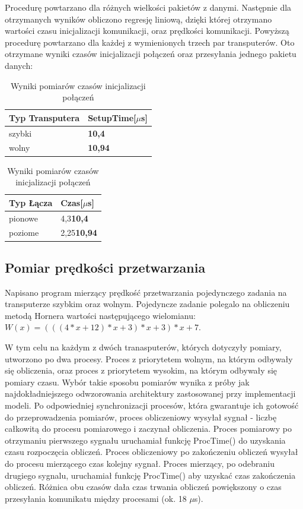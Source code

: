 \documentclass[a4paper,11pt, titlepage]{article}
\begin{document}
Procedurę powtarzano dla różnych wielkości pakietów z danymi. Następnie dla otrzymanych wyników obliczono regresję liniową, dzięki której otrzymano wartości czasu inicjalizacji komunikacji, oraz prędkości komunikacji. Powyższą procedurę powtarzano dla każdej z wymienionych trzech par transputerów. Oto otrzymane wyniki czasów inicjalizacji połączeń oraz przesyłania jednego pakietu danych:
\begin{table}[h!]
\begin{tabular}{|l|l|}\hline
Typ Transputera & SetupTime[$\mu$s]\\ \hline
szybki & \textbf{10,4}\\ \hline
wolny & \textbf{10,94}\\ \hline
\end{tabular}
\caption{Wyniki pomiarów czasów inicjalizacji połączeń \label{setuptime}}
\end{table}

\begin{table}[h!]
\begin{tabular}{|l|l|}\hline
Typ Łącza & Czas[$\mu$s]\\ \hline
pionowe & 4,3\textbf{10,4}\\ \hline
poziome & 2,25\textbf{10,94}\\ \hline
\end{tabular}
\caption{Wyniki pomiarów czasów inicjalizacji połączeń \label{comunication}}
\end{table}

\subsection{Pomiar prędkości przetwarzania}
Napisano program mierzący prędkość przetwarzania pojedynczego zadania na transputerze szybkim oraz wolnym. Pojedyncze zadanie polegalo na obliczeniu metodą Hornera wartości następującego wielomianu: $W(x) = (((4*x+12)*x+3)*x+3)*x+7$.

W tym celu na każdym z dwóch tranasputerów, których dotyczyły pomiary, utworzono po dwa procesy. Proces z priorytetem wolnym, na którym odbywały się obliczenia, oraz proces z priorytetem wysokim, na którym odbywały się pomiary czasu. Wybór takie sposobu pomiarów wynika z próby jak najdokładniejszego odwzorowania architektury zastosowanej przy implementacji modeli. Po odpowiedniej synchronizacji procesów, która gwarantuje ich gotowość do przeprowadzenia pomiarów, proces obliczeniowy wysyłał sygnał - liczbę całkowitą do procesu pomiarowego i zaczynał obliczenia.  Proces pomiarowy po otrzymaniu pierwszego sygnału uruchamiał funkcję ProcTime() do uzyskania czasu rozpoczęcia obliczeń. Proces obliczeniowy po zakończeniu obliczeń wysyłał do procesu mierzącego czas kolejny sygnał. Proces mierzący, po odebraniu drugiego sygnalu, uruchamiał funkcję ProcTime() aby uzyskać czas zakończenia obliczeń. Różnica obu czasów dała czas trwania obliczeń powiększony o czas przesyłania komunikatu między procesami (ok. 18 $\mu$s). 
\end{document}
